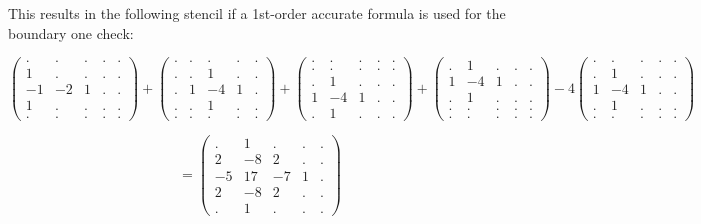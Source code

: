 This results in the following stencil if a 1st-order accurate formula is used 
for the boundary one {\color{red} check}:
{\small
\[
\begin{pmatrix}
. & . &  . & . & . \\
1 & . &  . & . & . \\
-1 & -2 & 1 & . & . \\
1 & . &  . & . & . \\
. & . &  . & . & . 
\end{pmatrix}
+
\begin{pmatrix}
. & . &  . & . & .\\
. & . &  1 & . & .\\
. & 1 & -4 & 1 & .\\
. & . &  1 & . & .\\
. & . &  . & . & .
\end{pmatrix}
+
\begin{pmatrix}
 . &  . & . & . &.\\
 . &  . & . & . &.\\
 . &  1 & . & . &.\\
 1 & -4 & 1 & . &.\\
 . &  1 & . & . &.
\end{pmatrix}
+
\begin{pmatrix}
 . &  1 & . & . &.\\
 1 & -4 & 1 & . &.\\
 . &  1 & . & . &.\\
 . &  . & . & . &.\\
 . &  . & . & . &.
\end{pmatrix}
-4
\begin{pmatrix}
 . &  . & . & . &.\\
 . &  1 & . & . &.\\
 1 & -4 & 1 & . &.\\
 . &  1 & . & . &.\\
 . &  . & . & . &.
\end{pmatrix}
\]

\[
=
\begin{pmatrix}
. &  1 & . & . &. \\
2 &  -8 & 2 & . &. \\
-5 &  17 & -7 & 1 &. \\
2 &  -8 & 2 & . &. \\
. &  1 & . & . &. 
\end{pmatrix}
\]
}

